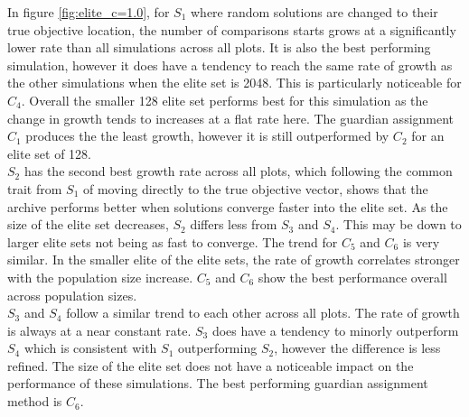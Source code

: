 \documentclass{ecmm427_assignment}
\begin{document}

In figure \ref{fig:elite_c=1.0}, for $S_1$ where random solutions are changed to their true objective location, the number of comparisons starts grows at a significantly lower rate than all simulations across all plots. It is also the best performing simulation, however it does have a tendency to reach the same rate of growth as the other simulations when the elite set is 2048. This is particularly noticeable for $C_4$. Overall the smaller 128 elite set performs best for this simulation as the change in growth tends to increases at a flat rate here. The guardian assignment $C_1$ produces the the least growth, however it is still outperformed by $C_2$ for an elite set of 128.\\
$S_2$ has the second best growth rate across all plots, which following the common trait from $S_1$ of moving directly to the true objective vector, shows that the archive performs better when solutions converge faster into the elite set. As the size of the elite set decreases, $S_2$ differs less from $S_3$ and $S_4$. This may be down to larger elite sets not being as fast to converge. The trend for $C_5$ and $C_6$ is very similar. In the smaller elite of the elite sets, the rate of growth correlates stronger with the population size increase. $C_5$ and $C_6$ show the best performance overall across population sizes.\\
$S_3$ and $S_4$ follow a similar trend to each other across all plots. The rate of growth is always at a near constant rate. $S_3$ does have a tendency to minorly outperform $S_4$ which is consistent with $S_1$ outperforming $S_2$, however the difference is less refined. The size of the elite set does not have a noticeable impact on the performance of these simulations. The best performing guardian assignment method is $C_6$.
 
\end{document}
